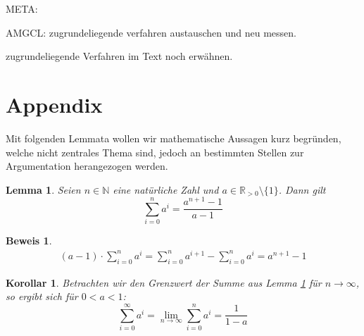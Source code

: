 \documentclass[a4paper]{article}
\newtheorem{korollar}[satz]{Korollar}
\newtheorem{lemma}[satz]{Lemma}
\theoremstyle{nonumberplain}
\newtheorem{beweis}{Beweis}
\newenvironment{meta}
{\begin{center} \Large \color{red} META: \hspace{2ex} \large \color{blue}}
	{\end{center}}
\begin{document}
\begin{meta}
	
	\item AMGCL: zugrundeliegende verfahren austauschen und neu messen.
	\item zugrundeliegende Verfahren im Text noch erwähnen.
	
\end{meta}

\section{Appendix}

Mit folgenden Lemmata wollen wir mathematische Aussagen kurz begründen, welche nicht zentrales Thema sind, jedoch an bestimmten Stellen zur Argumentation herangezogen werden.

\begin{lemma} \label{lem-geosum}
	Seien $n \in \mathbb{N}$ eine natürliche Zahl und $a \in \mathbb{R}_{>0}\setminus\{1\}$. Dann gilt
\begin{equation}
\sum_{i=0}^{n}{a^i} = \frac{a^{n+1}-1}{a-1}
\end{equation}
\end{lemma}
\begin{beweis}
\begin{align*}
	(a-1) \cdot \sum_{i=0}^{n}{a^i} = \sum_{i=0}^{n}{a^{i+1}} - \sum_{i=0}^{n}{a^i} = a^{n+1} - 1
\end{align*}
\end{beweis}

\begin{korollar} \label{kor-geosum}
Betrachten wir den Grenzwert der Summe aus Lemma \ref{lem-geosum} für $n \to \infty$, so ergibt sich für $0<a<1$:
\begin{equation}
\sum_{i=0}^{\infty}{a^i}
= \lim\limits_{n \to \infty} \sum_{i=0}^{n}{a^i}
= \frac{1}{1-a}
\end{equation}
\end{korollar}
\end{document}
